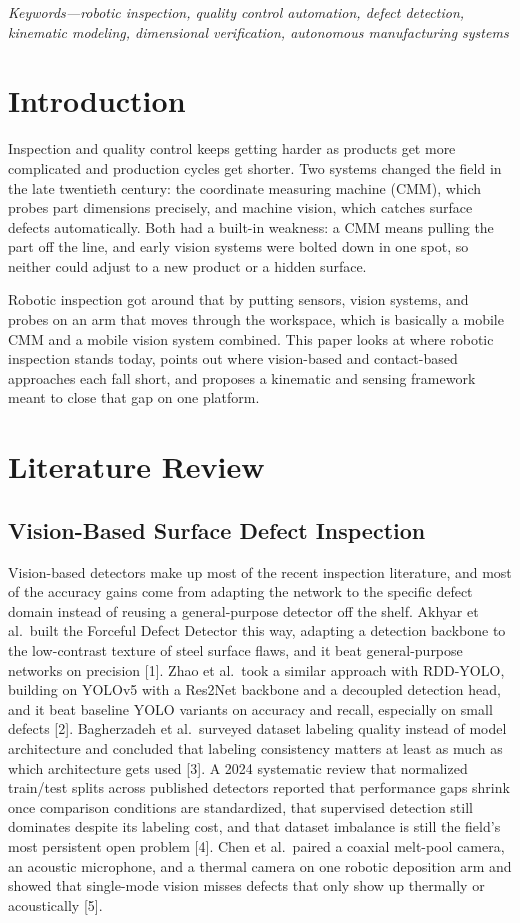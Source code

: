 \documentclass[conference]{IEEEtran}
\begin{document}
\textit{Keywords—robotic inspection, quality control automation, defect detection, kinematic modeling, dimensional verification, autonomous manufacturing systems}

\section{Introduction}
Inspection and quality control keeps getting harder as products get more complicated and production cycles get shorter. Two systems changed the field in the late twentieth century: the coordinate measuring machine (CMM), which probes part dimensions precisely, and machine vision, which catches surface defects automatically. Both had a built-in weakness: a CMM means pulling the part off the line, and early vision systems were bolted down in one spot, so neither could adjust to a new product or a hidden surface.

Robotic inspection got around that by putting sensors, vision systems, and probes on an arm that moves through the workspace, which is basically a mobile CMM and a mobile vision system combined. This paper looks at where robotic inspection stands today, points out where vision-based and contact-based approaches each fall short, and proposes a kinematic and sensing framework meant to close that gap on one platform.

\section{Literature Review}

\subsection{Vision-Based Surface Defect Inspection}
Vision-based detectors make up most of the recent inspection literature, and most of the accuracy gains come from adapting the network to the specific defect domain instead of reusing a general-purpose detector off the shelf. Akhyar et al.\ built the Forceful Defect Detector this way, adapting a detection backbone to the low-contrast texture of steel surface flaws, and it beat general-purpose networks on precision {[}1{]}. Zhao et al.\ took a similar approach with RDD-YOLO, building on YOLOv5 with a Res2Net backbone and a decoupled detection head, and it beat baseline YOLO variants on accuracy and recall, especially on small defects {[}2{]}. Bagherzadeh et al.\ surveyed dataset labeling quality instead of model architecture and concluded that labeling consistency matters at least as much as which architecture gets used {[}3{]}. A 2024 systematic review that normalized train/test splits across published detectors reported that performance gaps shrink once comparison conditions are standardized, that supervised detection still dominates despite its labeling cost, and that dataset imbalance is still the field's most persistent open problem {[}4{]}. Chen et al.\ paired a coaxial melt-pool camera, an acoustic microphone, and a thermal camera on one robotic deposition arm and showed that single-mode vision misses defects that only show up thermally or acoustically {[}5{]}.
\end{document}
